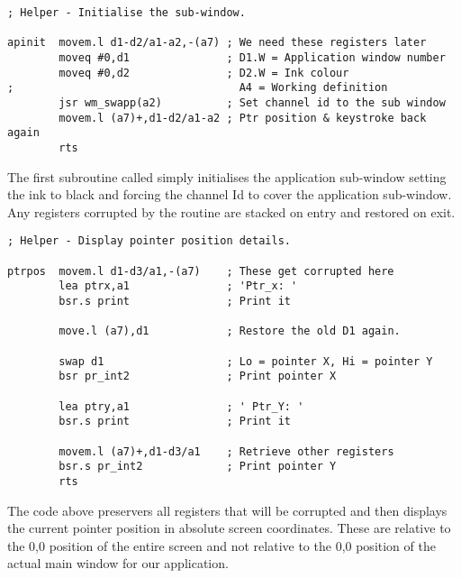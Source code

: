 \begin{lstlisting}[firstnumber=1,]
; Helper - Initialise the sub-window.

apinit  movem.l d1-d2/a1-a2,-(a7) ; We need these registers later
        moveq #0,d1               ; D1.W = Application window number
        moveq #0,d2               ; D2.W = Ink colour
;                                   A4 = Working definition
        jsr wm_swapp(a2)          ; Set channel id to the sub window
        movem.l (a7)+,d1-d2/a1-a2 ; Ptr position & keystroke back again
        rts
\end{lstlisting}

The first subroutine called simply initialises the application sub-{}window
        setting the ink to black and forcing the channel Id to cover the application
        sub-{}window. Any registers corrupted by the routine are stacked on entry and
        restored on exit.

\begin{lstlisting}[firstnumber=1,]
; Helper - Display pointer position details.

ptrpos  movem.l d1-d3/a1,-(a7)    ; These get corrupted here
        lea ptrx,a1               ; 'Ptr_x: '
        bsr.s print               ; Print it

        move.l (a7),d1            ; Restore the old D1 again.

        swap d1                   ; Lo = pointer X, Hi = pointer Y 
        bsr pr_int2               ; Print pointer X

        lea ptry,a1               ; ' Ptr_Y: '
        bsr.s print               ; Print it

        movem.l (a7)+,d1-d3/a1    ; Retrieve other registers
        bsr.s pr_int2             ; Print pointer Y
        rts
\end{lstlisting}

The code above preservers all registers that will be corrupted and then
        displays the current pointer position in absolute screen coordinates. These are
        relative to the 0,0 position of the entire screen and not relative to the 0,0
        position of the actual main window for our application. 


